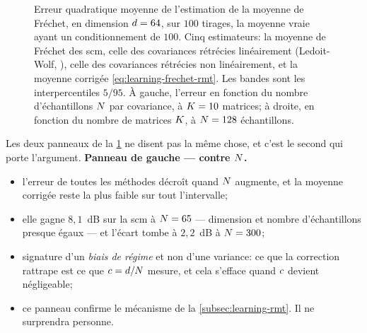 \begin{figure}[htb]
  \centering
  
  \provMseQR[1cm]
  \caption[Erreur d'estimation de la moyenne de Fréchet]{Erreur quadratique
    moyenne de l'estimation de la moyenne de Fréchet, en dimension
    $d=64$, sur $100$ tirages, la moyenne vraie ayant un conditionnement
    de $100$. Cinq estimateurs: la moyenne de Fréchet des scm, celle des
    covariances rétrécies linéairement (Ledoit-Wolf, ), celle des
    covariances rétrécies non linéairement, et la moyenne corrigée
    \cref{eq:learning-frechet-rmt}. Les bandes sont les interpercentiles
    $5/95$. À gauche, l'erreur en fonction du nombre d'échantillons $N$
    par covariance, à $K=10$ matrices; à droite, en fonction du nombre de
    matrices $K$, à $N=128$ échantillons. \provMse}
  \label{fig:learning-mse}
\end{figure}

Les deux panneaux de la \cref{fig:learning-mse} ne disent pas la même chose, et
c'est le second qui porte l'argument.
\textbf{Panneau de gauche --- contre $N$.}
\begin{itemize}
  \item l'erreur de toutes les méthodes décroît quand $N$ augmente, et la
    moyenne corrigée reste la plus faible sur tout l'intervalle;
  \item elle gagne $8{,}1$~dB sur la scm à $N=65$ --- dimension et nombre
    d'échantillons presque égaux --- et l'écart tombe à $2{,}2$~dB à
    $N=300$;
  \item signature d'un \emph{biais de régime} et non d'une variance: ce que la
    correction rattrape est ce que $c=d/N$ mesure, et cela
    s'efface quand $c$ devient négligeable;
  \item ce panneau confirme le mécanisme de la \cref{subsec:learning-rmt}. Il
    ne surprendra personne.
\end{itemize}

